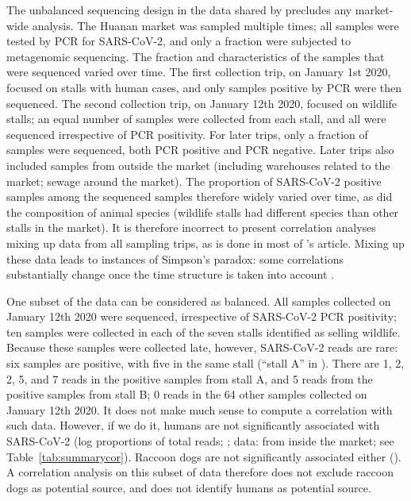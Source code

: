 \documentclass[11pt]{article}
\def \sct {\mbox{SARS-CoV-2}}
\begin{document}
The unbalanced sequencing design in the data shared by \citet{Liu2023Nature} precludes any market-wide analysis. The Huanan market was sampled multiple times; all samples were tested by PCR for \sct{}, and only a fraction were subjected to metagenomic sequencing. The fraction and characteristics of the samples that were sequenced varied over time. The first collection trip, on January 1st 2020, focused on stalls with human cases, and only samples positive by PCR were then sequenced. The second collection trip, on January 12th 2020, focused on wildlife stalls; an equal number of samples were collected from each stall, and all were sequenced irrespective of PCR positivity. For later trips, only a fraction of samples were sequenced, both PCR positive and PCR negative. Later trips also included samples from outside the market (including warehouses related to the market; sewage around the market). The proportion of \sct{} positive samples among the sequenced samples therefore widely varied over time, as did the composition of animal species (wildlife stalls had different species than other stalls in the market). It is therefore incorrect to present correlation analyses mixing up data from all sampling trips, as is done in most of \citet{Bloom2023VE}'s article. Mixing up these data leads to instances of Simpson's paradox: some correlations substantially change once the time structure is taken into account \citep[Figure~S4]{ACC2023bioRxiv}.

One subset of the data can be considered as balanced. All samples collected on January 12th 2020 were sequenced, irrespective of \sct{} PCR positivity; ten samples were collected in each of the seven stalls identified as selling wildlife. Because these samples were collected late, however, \sct{} reads are rare: six samples are positive, with five in the same stall (``stall A'' in \citet{ACC2023bioRxiv}). There are 1, 2, 2, 5, and 7 reads in the positive samples from stall A, and 5 reads from the positive samples from stall B; 0 reads in the 64 other samples collected on January 12th 2020. It does not make much sense to compute a correlation with such data. However, if we do it, humans are not significantly associated with \sct{} (log proportions of total reads; \JBTwelfthSCHS{}; data: \citet{Bloom2023VE} from inside the market; see Table~\ref{tab:summarycor}). Raccoon dogs are not significantly associated either (\JBTwelfthSCRD{}). A correlation analysis on this subset of data therefore does not exclude raccoon dogs as potential source, and does not identify humans as potential source.
\end{document}
